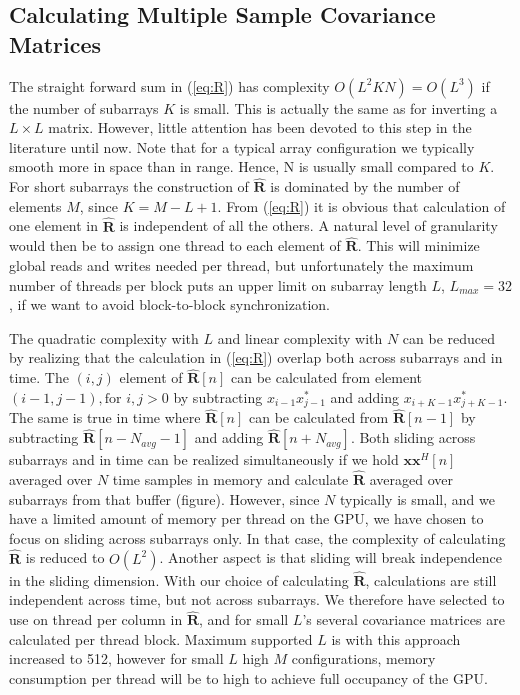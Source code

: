 \documentclass[journal]{IEEEtran}
\newcommand{\mat}[1]{\mathbf{#1}}
\renewcommand{\vec}[1]{\mathbf{#1}}
\begin{document}


\subsection{Calculating Multiple Sample Covariance Matrices}

The straight forward sum in (\ref{eq:R}) has complexity $O(L^2KN) = O(L^3)$ if the number of subarrays $K$ is small. This is actually the same as for inverting a $L \times L$ matrix. However, little attention has been devoted to this step in the literature until now. Note that for a typical array configuration we typically smooth more in space than in range. Hence, N is usually small compared to $K$. For short subarrays the construction of $\mat{\hat{R}}$ is dominated by the number of elements $M$, since $K = M - L + 1$. From (\ref{eq:R}) it is obvious that calculation of one element in $\mat{\hat{R}}$ is independent of all the others. A natural level of granularity would then be to assign one thread to each element of $\mat{\hat{R}}$. This will minimize global reads and writes needed per thread, but unfortunately the maximum number of threads per block puts an upper limit on subarray length $L$, $L_{max}=32$, if we want to avoid block-to-block synchronization.

The quadratic complexity with $L$ and linear complexity with $N$ can be reduced by realizing that the calculation in (\ref{eq:R}) overlap both across subarrays and in time. The $(i,j)$ element of $\mat{\hat{R}}[n]$ can be calculated from element $(i-1, j-1), \text{for } i,j > 0$ by subtracting $x_{i-1}x_{j-1}^*$ and adding $x_{i+K-1}x_{j+K-1}^*$. The same is true in time where $\mat{\hat{R}}[n]$ can be calculated from $\mat{\hat{R}}[n-1]$ by subtracting $\mat{\hat{R}}[n-N_{avg}-1]$ and adding $\mat{\hat{R}}[n+N_{avg}]$. Both sliding across subarrays and in time can be realized simultaneously if we hold $\vec{x}\vec{x}^H[n]$ averaged over $N$ time samples in memory and calculate $\mat{\hat{R}}$ averaged over subarrays from that buffer (figure). However, since $N$ typically is small, and we have a limited amount of memory per thread on the GPU, we have chosen to focus on sliding across subarrays only. In that case, the complexity of calculating $\mat{\hat{R}}$ is reduced to $O(L^2)$. Another aspect is that sliding will break independence in the sliding dimension. With our choice of calculating $\mat{\hat{R}}$, calculations are still independent across time, but not across subarrays. We therefore have selected to use on thread per column in $\mat{\hat{R}}$, and for small $L$'s several covariance matrices are calculated per thread block. Maximum supported $L$ is with this approach increased to 512, however for small $L$ high $M$ configurations, memory consumption per thread will be to high to achieve full occupancy of the GPU.
\end{document}
